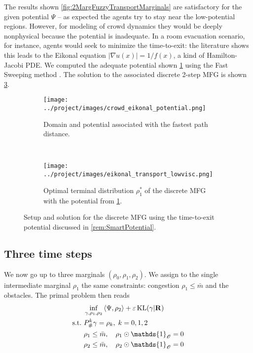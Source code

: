 \documentclass[../report.tex]{subfiles}
\begin{document}
\begin{remark}\label{rem:SmartPotential} The results shown \cref{fig:2MargFuzzyTransportMarginals} are satisfactory for the given potential $\Psi$ -- as expected the agents try to stay near the low-potential regions. However, for modeling of crowd dynamics they would be deeply nonphysical because the potential is inadequate. In a room evacuation scenario, for instance, agents would seek to minimize the time-to-exit: the literature shows this leads to the Eikonal equation $|\nabla u(x)| = 1/f(x)$, a kind of Hamilton-Jacobi PDE. We computed the adequate potential shown \cref{fig:CrowdShortedPathPotential} using the Fast Sweeping method \parencite{Zhao2004AFS}. The solution to the associated discrete 2-step MFG is shown \cref{fig:2MargEikonalGame}.
\end{remark}


\begin{figure}
	\centering
	\begin{subfigure}[b]{.4\linewidth}
		\centering
		\texttt{[image: ../project/images/crowd\_eikonal\_potential.png]}
		\caption{Domain and potential associated with the fastest path distance.}\label{fig:CrowdShortedPathPotential}
	\end{subfigure}~
	\begin{subfigure}[b]{.34\linewidth}
		\centering
		\texttt{[image: ../project/images/eikonal\_transport\_lowvisc.png]}
		\caption{Optimal terminal distribution $\rho^*_1$ of the discrete MFG with the potential from \cref{fig:CrowdShortedPathPotential}.}\label{fig:2MargEikonalGame}
	\end{subfigure}
	\caption{Setup and solution for the discrete MFG using the time-to-exit potential discussed in \cref{rem:SmartPotential}.}
\end{figure}


\subsection{Three time steps}

We now go up to three marginals $(\rho_0,\rho_1,\rho_2)$. We assign to the single intermediate marginal $\rho_1$ the same constraints: congestion $\rho_1 \leq \bar{m}$ and the obstacles. The primal problem then reads
\begin{equation}
\begin{aligned}
	&\inf_{\gamma,\rho_1,\rho_2}{} \langle \Psi, \rho_2\rangle + \epsilon \KL(\gamma | \bfR) \\
	\suchthat \ & P^k_\#\gamma = \rho_k,\; k = 0,1,2 \\
	& \rho_1 \leq \bar{m}, \quad \rho_1\odot\mathds{1}_{\mathscr O} = 0\\
	& \rho_2 \leq \bar{m}, \quad \rho_2\odot\mathds{1}_{\mathscr O} = 0
\end{aligned}
\end{equation}
\end{document}
